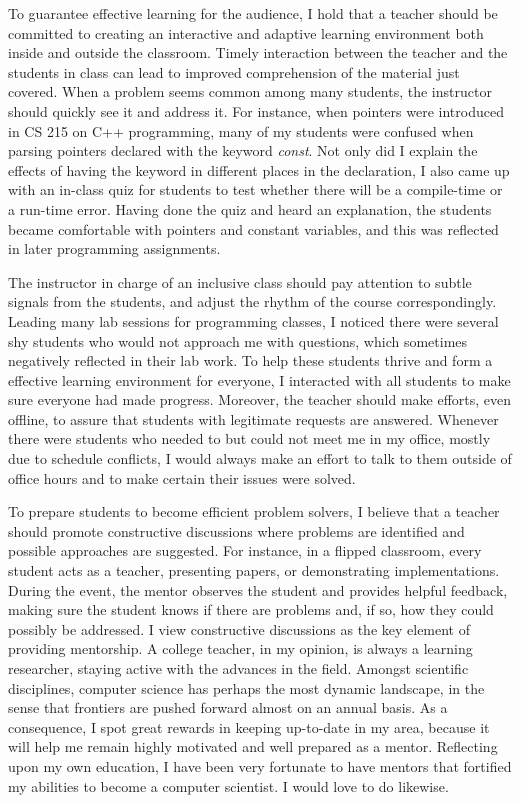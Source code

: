 \documentclass[12pt]{article}
\newcommand{\tit}[1]{\textit{#1}}
\begin{document}
To guarantee effective learning for the audience, 
I hold that a teacher should be committed to
creating an interactive and adaptive learning environment both inside
and outside the classroom.
Timely interaction between the teacher and the students in class can lead to improved
comprehension of the material just covered.
When a problem seems common among many students, the instructor should quickly
see it and address it.
For instance, when pointers were introduced in CS 215 on C++ programming, 
many of my students were confused when parsing pointers declared with the keyword \tit{const}.
Not only did I explain the effects of having the keyword in different places in the
declaration, I also came up with an in-class quiz for students to test whether there
will be a compile-time or a run-time error.
Having done the quiz and heard an explanation, the students became comfortable with
pointers and constant variables, and this was reflected in later programming assignments.

The instructor in charge of an inclusive class should
pay attention to subtle signals from the students, 
and adjust the rhythm of the course correspondingly.
Leading many lab sessions for programming classes,
I noticed there were several shy students who would not approach me with questions,
which sometimes negatively reflected in their lab work.
To help these students thrive and form a effective learning environment for everyone, 
I interacted with all students to make sure everyone had made progress.
Moreover, the teacher should make efforts, even offline, 
to assure that students with legitimate requests are answered.
Whenever there were students who needed to but could not
meet me in my office, mostly due to schedule conflicts, 
I would always make an effort to talk to them outside of office hours and
to make certain their issues were solved.

To prepare students to become efficient problem solvers, 
I believe that a teacher should promote
constructive discussions where problems are identified and possible approaches are suggested.
For instance, in a flipped classroom, every student acts as a teacher, presenting papers,
or demonstrating implementations.  During the event, the mentor observes the student and
provides helpful feedback, making sure the student knows if there are problems and, if so,
how they could possibly be addressed.
I view constructive discussions as the key element of providing mentorship.
A college teacher, in my opinion, is always a learning researcher, staying
active with the advances in the field.
Amongst scientific disciplines,
computer science has perhaps the most dynamic landscape, in the sense that
frontiers are pushed forward almost on an annual basis.
As a consequence, I spot great rewards in keeping up-to-date in my area,
because it will help me remain highly motivated and well prepared as a mentor.
Reflecting upon my own education, I have been very fortunate to have mentors
that fortified my abilities to become a computer scientist.
I would love to do likewise.
\end{document}
